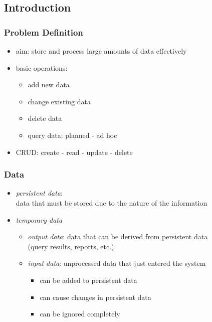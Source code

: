 \documentclass[dvipsnames]{beamer}
\theoremstyle{plain}
\begin{document}
\subsection{Introduction}

\begin{frame}
  \frametitle{Problem Definition}

  \begin{itemize}
    \item aim: store and process large amounts of data effectively

    \pause
    \medskip
    \item basic operations:
    \begin{itemize}
      \item add new data
      \item change existing data
      \item delete data
      \item query data: planned - ad hoc
    \end{itemize}
    \item \alert{CRUD}: create - read - update - delete
  \end{itemize}
\end{frame}

\begin{frame}
  \frametitle{Data}

  \begin{itemize}
    \item \emph{persistent data}:\\
      data that must be stored due to the nature of the information

    \pause
    \bigskip
    \item \emph{temporary data}
    \begin{itemize}
      \item \emph{output data}: data that can be derived from persistent data\\
        (query results, reports, etc.)

      \medskip
      \item \emph{input data}: unprocessed data that just entered the system
      \begin{itemize}
        \item can be added to persistent data
        \item can cause changes in persistent data
        \item can be ignored completely
      \end{itemize}
    \end{itemize}
  \end{itemize}
\end{frame}
\end{document}
